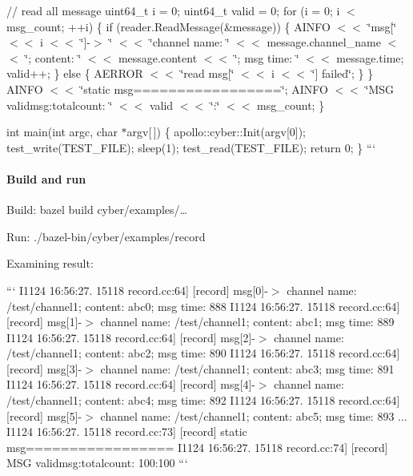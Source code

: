 {\ttfamily  // read all message uint64\-\_\-t i = 0; uint64\-\_\-t valid = 0; for (i = 0; i $<$ msg\-\_\-count; ++i) \{ if (reader.\-Read\-Message(\&message)) \{ A\-I\-N\-F\-O $<$$<$ \char`\"{}msg\mbox{[}\char`\"{} $<$$<$ i $<$$<$ \char`\"{}\mbox{]}-\/$>$ \char`\"{} $<$$<$ \char`\"{}channel name\-: \char`\"{} $<$$<$ message.\-channel\-\_\-name $<$$<$ \char`\"{}; content\-: \char`\"{} $<$$<$ message.\-content $<$$<$ \char`\"{}; msg time\-: \char`\"{} $<$$<$ message.\-time; valid++; \} else \{ A\-E\-R\-R\-O\-R $<$$<$ \char`\"{}read msg\mbox{[}\char`\"{} $<$$<$ i $<$$<$ \char`\"{}\mbox{]} failed\char`\"{}; \} \} A\-I\-N\-F\-O $<$$<$ \char`\"{}static msg=================\char`\"{}; A\-I\-N\-F\-O $<$$<$ \char`\"{}\-M\-S\-G validmsg\-:totalcount\-: \char`\"{} $<$$<$ valid $<$$<$ \char`\"{}\-:\char`\"{} $<$$<$ msg\-\_\-count; \}}

{\ttfamily int main(int argc, char $\ast$argv\mbox{[}$\,$\mbox{]}) \{ apollo\-::cyber\-::\-Init(argv\mbox{[}0\mbox{]}); test\-\_\-write(\-T\-E\-S\-T\-\_\-\-F\-I\-L\-E); sleep(1); test\-\_\-read(\-T\-E\-S\-T\-\_\-\-F\-I\-L\-E); return 0; \} ``` \paragraph*{Build and run}}

{\ttfamily 
\begin{DoxyItemize}
\item Build\-: bazel build cyber/examples/…
\item Run\-: ./bazel-\/bin/cyber/examples/record
\item Examining result\-:
\end{DoxyItemize}}

{\ttfamily ``` I1124 16\-:56\-:27. 15118 record.\-cc\-:64\mbox{]} \mbox{[}record\mbox{]} msg\mbox{[}0\mbox{]}-\/$>$ channel name\-: /test/channel1; content\-: abc0; msg time\-: 888 I1124 16\-:56\-:27. 15118 record.\-cc\-:64\mbox{]} \mbox{[}record\mbox{]} msg\mbox{[}1\mbox{]}-\/$>$ channel name\-: /test/channel1; content\-: abc1; msg time\-: 889 I1124 16\-:56\-:27. 15118 record.\-cc\-:64\mbox{]} \mbox{[}record\mbox{]} msg\mbox{[}2\mbox{]}-\/$>$ channel name\-: /test/channel1; content\-: abc2; msg time\-: 890 I1124 16\-:56\-:27. 15118 record.\-cc\-:64\mbox{]} \mbox{[}record\mbox{]} msg\mbox{[}3\mbox{]}-\/$>$ channel name\-: /test/channel1; content\-: abc3; msg time\-: 891 I1124 16\-:56\-:27. 15118 record.\-cc\-:64\mbox{]} \mbox{[}record\mbox{]} msg\mbox{[}4\mbox{]}-\/$>$ channel name\-: /test/channel1; content\-: abc4; msg time\-: 892 I1124 16\-:56\-:27. 15118 record.\-cc\-:64\mbox{]} \mbox{[}record\mbox{]} msg\mbox{[}5\mbox{]}-\/$>$ channel name\-: /test/channel1; content\-: abc5; msg time\-: 893 ... I1124 16\-:56\-:27. 15118 record.\-cc\-:73\mbox{]} \mbox{[}record\mbox{]} static msg================= I1124 16\-:56\-:27. 15118 record.\-cc\-:74\mbox{]} \mbox{[}record\mbox{]} M\-S\-G validmsg\-:totalcount\-: 100\-:100 ```}

